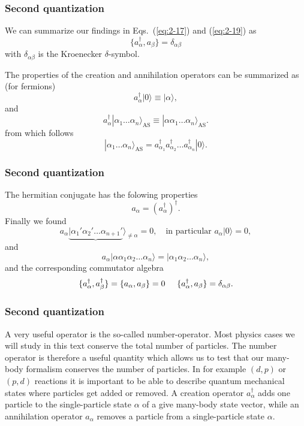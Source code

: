 \documentclass{beamer}
\begin{document}
\begin{frame}
\frametitle{Second quantization}

\begin{block}{}
We can summarize  our findings in Eqs.~(\ref{eq:2-17}) and (\ref{eq:2-19}) as 
\begin{equation}
	\{a_\alpha^{\dagger},a_\beta \} = \delta_{\alpha\beta} \label{eq:2-20}
\end{equation}
with  $\delta_{\alpha\beta}$ is the Kroenecker $\delta$-symbol.

The properties of the creation and annihilation operators can be summarized as (for fermions)
\[
	a_\alpha^{\dagger}|0\rangle \equiv  |\alpha\rangle,
\]
and
\[
	a_\alpha^{\dagger}|\alpha_1\dots \alpha_n\rangle_{\mathrm{AS}} \equiv  |\alpha\alpha_1\dots \alpha_n\rangle_{\mathrm{AS}}. 
\]
from which follows
\[
        |\alpha_1\dots \alpha_n\rangle_{\mathrm{AS}} = a_{\alpha_1}^{\dagger} a_{\alpha_2}^{\dagger} \dots a_{\alpha_n}^{\dagger} |0\rangle.
\]
\end{block}
\end{frame}

\begin{frame}
\frametitle{Second quantization}

\begin{block}{}
The hermitian conjugate has the folowing properties
\[
        a_{\alpha} = ( a_{\alpha}^{\dagger} )^{\dagger}.
\]
Finally we found 
\[
	a_\alpha\underbrace{|\alpha_1'\alpha_2' \dots \alpha_{n+1}'}\rangle_{\neq \alpha} = 0, \quad
		\textrm{in particular } a_\alpha |0\rangle = 0,
\]
and
\[
 a_\alpha |\alpha\alpha_1\alpha_2 \dots \alpha_{n}\rangle = |\alpha_1\alpha_2 \dots \alpha_{n}\rangle,
\]
and the corresponding commutator algebra
\[
	\{a_{\alpha}^{\dagger},a_{\beta}^{\dagger}\} = \{a_{\alpha},a_{\beta}\} = 0 \hspace{0.5cm} 
\{a_\alpha^{\dagger},a_\beta \} = \delta_{\alpha\beta}.
\]
\end{block}
\end{frame}

\begin{frame}
\frametitle{Second quantization}

\begin{block}{}
A very useful operator is the so-called number-operator.  Most physics cases  we will
study in this text conserve the total number of particles.  The number operator is therefore
a useful quantity which allows us to test that our many-body formalism  conserves the number of particles.
In for example $(d,p)$ or $(p,d)$ reactions it is important to be able to describe quantum mechanical states
where particles get added or removed.
A creation operator $a_\alpha^{\dagger}$ adds one particle to the single-particle state
$\alpha$ of a give many-body state vector, while an annihilation operator $a_\alpha$ 
removes a particle from a single-particle
state $\alpha$. 
\end{block}
\end{frame}
\end{document}
